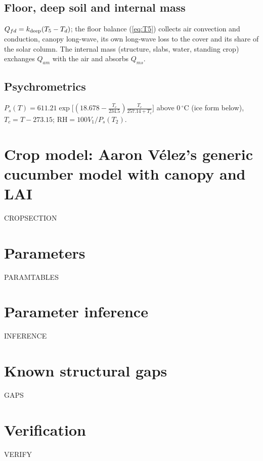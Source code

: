 \documentclass[11pt,a4paper]{article}
\begin{document}
\subsection{Floor, deep soil and internal mass}
$Q_{fd}=k_{\rm deep}(T_5-T_d)$; the floor balance (\ref{eq:T5}) collects air convection and conduction, canopy long-wave,
its own long-wave loss to the cover and its share of the solar column. The internal mass (structure, slabs, water, standing
crop) exchanges $Q_{am}$ with the air and absorbs $Q_{ms}$.

\subsection{Psychrometrics}
$P_s(T)=611.21\exp\bigl[(18.678-\frac{T_c}{234.5})\frac{T_c}{257.14+T_c}\bigr]$ above 0\,$^\circ$C (ice form below),
$T_c=T-273.15$; $\mathrm{RH}=100V_1/P_s(T_2)$.

\section{Crop model: Aaron V\'elez's generic cucumber model with canopy and LAI}\label{sec:crop}
CROPSECTION

\section{Parameters}\label{sec:params}
PARAMTABLES

\section{Parameter inference}\label{sec:inference}
INFERENCE

\section{Known structural gaps}\label{sec:gaps}
GAPS

\section{Verification}\label{sec:verify}
VERIFY
\end{document}
